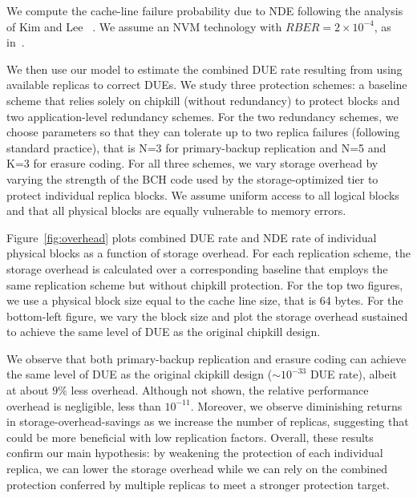 \noindent We compute the cache-line failure probability due to NDE following the analysis of Kim and Lee~
\cite{kim:undetected-error-bch:ieee-tc:1996}.
We assume an NVM technology with $RBER=2\times10^{-4}$, as in~\cite{zhang:pm-chipkill:micro:2018}.

We then use our model to estimate the combined DUE rate resulting from using available replicas to correct DUEs. 
We study three protection schemes: a baseline scheme that relies solely on chipkill (without redundancy) to protect blocks and two application-level redundancy schemes.
For the two redundancy schemes, we choose parameters so that they can tolerate up to two replica failures (following standard practice),
that is N=3 for primary-backup replication and N=5 and K=3 for erasure coding.
For all three schemes, we vary storage overhead by varying the strength of the BCH code used by the storage-optimized tier to protect individual replica blocks.
We assume uniform access to all logical blocks and that all physical blocks are equally vulnerable to memory errors.

Figure~\ref{fig:overhead} plots combined DUE rate and NDE rate of individual physical blocks as a function of storage overhead.
For each replication scheme, the storage overhead is calculated over a corresponding baseline that employs the same replication scheme but without chipkill protection. 
For the top two figures, we use a physical block size equal to the cache line size, that is 64 bytes.
For the bottom-left figure, we vary the block size and plot the storage overhead sustained to achieve the same level of DUE as the original chipkill design.

We observe that both primary-backup replication and erasure coding can achieve the same level of DUE as the original ckipkill design ($\sim10^{-33}$ DUE rate), albeit at about $9\%$ less overhead.
Although not shown, the relative performance overhead is negligible, less than $10^{-11}$.
Moreover, we observe diminishing returns in storage-overhead-savings as we increase the number of replicas, suggesting that \ramp could be more beneficial with low replication factors. Overall, these results confirm our main hypothesis: by weakening the protection of each individual replica, we can lower the storage overhead while we can rely on the combined protection conferred by multiple replicas to meet a stronger protection target.

